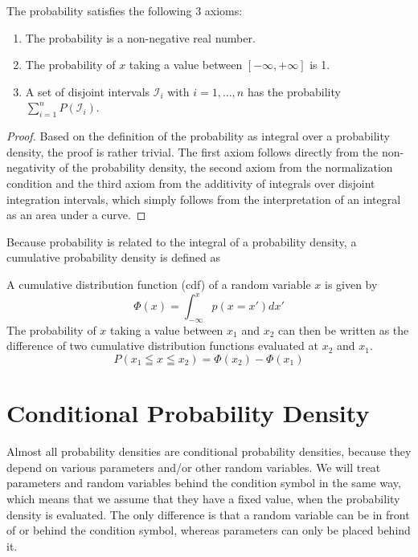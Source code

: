 \documentclass{tstextbook}
\begin{document}
\begin{theorem}
  \label{th:probabilityaxioms}
  The probability satisfies the following 3 axioms: 
  \begin{enumerate}
\item 
The probability is a non-negative real number.
\item
The probability of $x$ taking a value between $[-\infty,+\infty]$ is 1.
\item
A set of disjoint intervals $\mathcal{I}_i$ with $i=1,\ldots,n$ has the probability $\sum_{i=1}^n P(\mathcal{I}_i)$.
\end{enumerate}
\end{theorem}
\begin{proof}
Based on the definition of the probability as integral over a probability density, the proof is rather trivial. The first axiom follows directly from the non-negativity of the probability density, the second axiom from the normalization condition and the third axiom from the additivity of integrals over disjoint integration intervals, which simply follows from the interpretation of an integral as an area under a curve.
\end{proof}
Because probability is related to the integral of a probability density, a cumulative probability density is defined as
\begin{definition}
  \label{th:cumulativedistributionfunction}
  A cumulative distribution function (cdf) of a random variable $x$ is given by
  \begin{equation}
    \Phi(x)=\int_{-\infty}^{x}p(x=x')dx'
  \end{equation}
The probability of $x$ taking a value between $x_1$ and $x_2$ can then be written as the difference of two cumulative distribution functions evaluated at $x_2$ and $x_1$.
  \begin{equation}
    P(x_1\leqq x\leqq x_2)=\Phi(x_2)-\Phi(x_1)
  \end{equation} 
\end{definition}

\section{Conditional Probability Density}

Almost all probability densities are conditional probability densities, because they depend on various parameters and/or other random variables. We will treat parameters and random variables behind the condition symbol in the same way, which means that we assume that they have a fixed value, when the probability density is evaluated. The only difference is that a random variable can be in front of or behind the condition symbol, whereas parameters can only be placed behind it.
\end{document}
